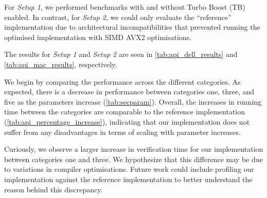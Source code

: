 \documentclass[11pt]{report}
\theoremstyle{definition}
\theoremstyle{plain}
\begin{document}
For \textit{Setup 1}, we performed benchmarks with and without Turbo Boost (TB) enabled. In contrast, for \textit{Setup 2}, we could only evaluate the ``reference'' implementation due to architectural incompatibilities that prevented running the optimised implementation with SIMD AVX2 optimisations.

The results for \textit{Setup 1} and \textit{Setup 2} are seen in \autoref{tab:api_dell_results} and \autoref{tab:api_mac_results}, respectively.

We begin by comparing the performance across the different categories. As expected, there is a decrease in performance between categories one, three, and five as the parameters increase (\autoref{tab:secparam}). Overall, the increases in running time between the categories are comparable to the reference implementation (\autoref{tab:api_percentage_increase}), indicating that our implementation does not suffer from any disadvantages in terms of scaling with parameter increases.

Curiously, we observe a larger increase in verification time for our implementation between categories one and three. We hypothesize that this difference may be due to variations in compiler optimisations. Future work could include profiling our implementation against the reference implementation to better understand the reason behind this discrepancy.
\end{document}
